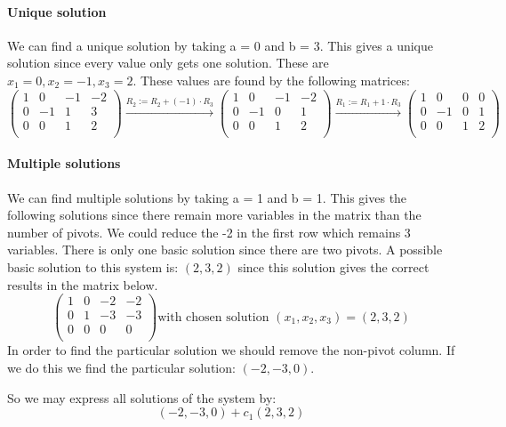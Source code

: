 \documentclass[a4paper]{article}
\begin{document}
\paragraph{Unique solution} We can find a unique solution by taking a = 0 and b = 3. This gives a unique solution since every value only gets one solution. These are $x_1 = 0, x_2 = -1, x_3 = 2$. These values are found by the following matrices:
\[
\left(
\begin{array}{ccc|c}
1 & 0 & - 1 & -2   \\
0 & -1 & 1 & 3  \\
0 & 0 & 1 & 2 \\
\end{array}
\right)
\xrightarrow{\text{$R_2 := R_2 + (-1) \cdot R_3$}}
\left(
\begin{array}{ccc|c}
1 & 0 & - 1 & -2   \\
0 & -1 & 0 & 1  \\
0 & 0 & 1 & 2 \\
\end{array}
\right)
\xrightarrow{\text{$R_1 := R_1 + 1 \cdot R_3$}}
\left(
\begin{array}{ccc|c}
1 & 0 & 0 & 0   \\
0 & -1 & 0 & 1  \\
0 & 0 & 1 & 2 \\
\end{array}
\right)
\]
\paragraph{Multiple solutions} We can find multiple solutions by taking a = 1 and b = 1. This gives the following solutions since there remain more variables in the matrix than the number of pivots. We could reduce the -2 in the first row which remains 3 variables. There is only one basic solution since there are two pivots. A possible basic solution to this system is: $(2, 3, 2)$ since this solution gives the correct results in the matrix below.
\[
\left(
\begin{array}{ccc|c}
1 & 0 & -2 & -2   \\
0 & 1 & -3 & -3  \\
0 & 0 & 0 & 0 \\
\end{array}
\right)
\text{with chosen solution $(x_1, x_2, x_3) = (2, 3, 2)$}
\]
In order to find the particular solution we should remove the non-pivot column. If we do this we find the particular solution: $(-2, -3, 0)$.

So we may express all solutions of the system by:
\[
(-2, -3, 0) + c_1(2, 3, 2)
\]
\end{document}
